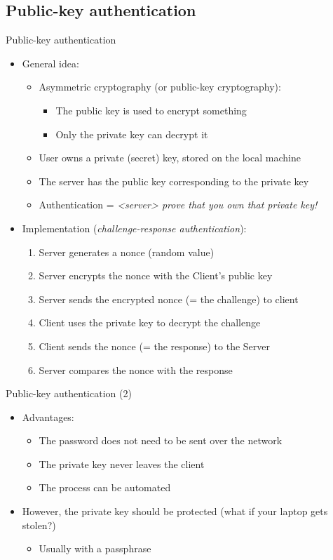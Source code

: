 \documentclass[11pt,final,usepdftitle=false]{beamer}
\begin{document}
\subsection{Public-key authentication}
\begin{frame}{Public-key authentication}
\begin{itemize}
\item General idea:
	\begin{itemize}
		\item Asymmetric cryptography (or public-key cryptography):
			\begin{itemize}
				\item The public key is used to encrypt something
				\item Only the private key can decrypt it
			\end{itemize}
		\item User owns a private (secret) key, stored on the local machine
		\item The server has the public key corresponding to the private key 
		\item Authentication = \textsl{<server> prove that you own that private key!}
	\end{itemize}
\hbr
\item Implementation (\textsl{challenge-response authentication}):
	\begin{enumerate}
		\item Server generates a nonce (random value)
		\item Server encrypts the nonce with the Client's public key
		\item Server sends the encrypted nonce (= the challenge) to client
		\item Client uses the private key to decrypt the challenge
		\item Client sends the nonce (= the response) to the Server
		\item Server compares the nonce with the response
	\end{enumerate}
\end{itemize}
\end{frame}

\begin{frame}{Public-key authentication (2)}
\begin{itemize}
	\item Advantages:
		\begin{itemize}
			\item The password does not need to be sent over the network
			\hbr
			\item The private key never leaves the client
			\hbr
			\item The process can be automated
		\end{itemize}
	\hbr
	\item However, the private key should be protected (what if your laptop gets stolen?)
		\begin{itemize}
			\item Usually with a passphrase
		\end{itemize}
\end{itemize}
\end{frame}
\end{document}
